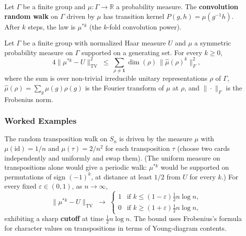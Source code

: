 \begin{definition}\label{def:convchain}
Let $\Gamma$ be a finite group and $\mu : \Gamma \to \mathbb R$ a
probability measure. The \textbf{convolution random walk} on $\Gamma$
driven by $\mu$ has transition kernel $P(g, h) = \mu(g^{-1} h)$. After
$k$ steps, the law is $\mu^{*k}$ (the $k$-fold convolution power).
\end{definition}

\begin{theorem}\label{thm:dsubl}
Let $\Gamma$ be a finite group with normalized Haar measure $U$ and
$\mu$ a symmetric probability measure on $\Gamma$ supported on a
generating set. For every $k \ge 0$,
\[
  4 \big\| \mu^{*k} - U \big\|_{\mathrm{TV}}^2
  \;\le\;
  \sum_{\rho \ne \mathbf{1}} \dim(\rho)\, \big\|\widehat\mu(\rho)^k\big\|_F^2,
\]
where the sum is over non-trivial irreducible unitary
representations $\rho$ of $\Gamma$, $\widehat\mu(\rho) = \sum_g \mu(g) \rho(g)$
is the Fourier transform of $\mu$ at $\rho$, and $\| \cdot \|_F$ is
the Frobenius norm.
\end{theorem}

\subsubsection{Worked Examples}

\begin{example}
The random transposition walk on $S_n$ is driven by the measure $\mu$
with $\mu(\mathrm{id}) = 1/n$ and $\mu(\tau) = 2/n^2$ for each
transposition $\tau$ (choose two cards independently and uniformly
and swap them). (The uniform measure on transpositions alone would
give a periodic walk: $\mu^{*k}$ would be supported on permutations
of sign $(-1)^k$, at distance at least $1/2$ from $U$ for every $k$.)
For every fixed $\varepsilon \in (0, 1)$, as $n \to \infty$,
\[
  \big\| \mu^{*k} - U \big\|_{\mathrm{TV}}
  \;\longrightarrow\;
  \begin{cases}
    1 & \text{if } k \le (1 - \varepsilon) \tfrac{1}{2} n \log n, \\
    0 & \text{if } k \ge (1 + \varepsilon) \tfrac{1}{2} n \log n,
  \end{cases}
\]
exhibiting a sharp \textbf{cutoff} at time $\tfrac{1}{2} n \log n$.
The bound uses Frobenius's formula for character values on
transpositions in terms of Young-diagram contents.
\end{example}

